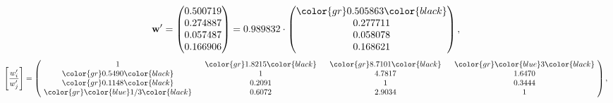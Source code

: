 \begin{example}
\begin{equation*}
\mathbf{w}^{\prime} =
\begin{pmatrix}
0.500719\\
0.274887\\
0.057487\\
0.166906
\end{pmatrix} =
0.989832\cdot
\begin{pmatrix}
\color{gr} 0.505863\color{black} \\
0.277711\\
0.058078\\
0.168621
\end{pmatrix},
\end{equation*}
\begin{equation*}
\left[ \frac{{w}^{\prime}_i}{{w}^{\prime}_j} \right] =
\begin{pmatrix}
$\,\,$ 1 $\,\,$ & $\,\,$\color{gr} 1.8215\color{black} $\,\,$ & $\,\,$\color{gr} 8.7101\color{black} $\,\,$ & $\,\,$\color{gr} \color{blue} 3\color{black} $\,\,$ \\
$\,\,$\color{gr} 0.5490\color{black} $\,\,$ & $\,\,$ 1 $\,\,$ & $\,\,$4.7817$\,\,$ & $\,\,$1.6470  $\,\,$ \\
$\,\,$\color{gr} 0.1148\color{black} $\,\,$ & $\,\,$0.2091$\,\,$ & $\,\,$ 1 $\,\,$ & $\,\,$0.3444 $\,\,$ \\
$\,\,$\color{gr} \color{blue}  1/3\color{black} $\,\,$ & $\,\,$0.6072$\,\,$ & $\,\,$2.9034$\,\,$ & $\,\,$ 1  $\,\,$ \\
\end{pmatrix},
\end{equation*}
\end{example}
\newpage
